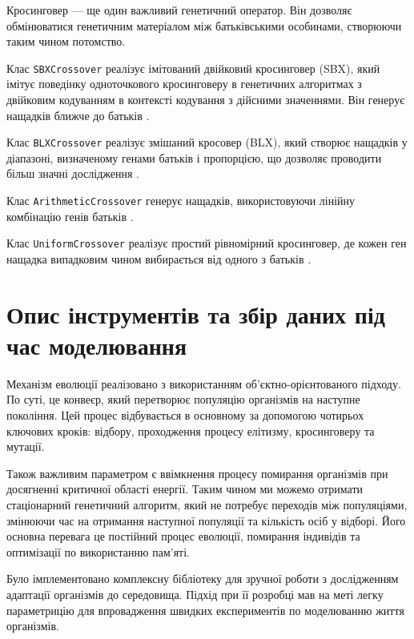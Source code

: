 Кросинговер --- ще один важливий генетичний оператор. 
Він дозволяє обмінюватися генетичним матеріалом між 
батьківськими особинами, створюючи таким чином потомство.

Клас \verb+SBXCrossover+ реалізує імітований двійковий 
кросинговер (SBX), який імітує поведінку одноточкового кросинговеру 
в генетичних алгоритмах з двійковим кодуванням в контексті кодування 
з дійсними значеннями. 
Він генерує нащадків ближче до батьків 
\cite{debSIMULATEDBINARYCROSSOVER, debSelfadaptiveSimulatedBinary2007}.

Клас \verb+BLXCrossover+ реалізує змішаний кросовер (BLX), 
який створює нащадків у діапазоні, визначеному генами батьків 
і пропорцією, що дозволяє проводити більш значні дослідження 
\cite{debSIMULATEDBINARYCROSSOVER}.

Клас \verb+ArithmeticCrossover+ генерує нащадків, 
використовуючи лінійну комбінацію генів батьків 
\cite{koraCrossoverOperatorsGenetic2017}.

Клас \verb+UniformCrossover+ реалізує простий рівномірний кросинговер,
де кожен ген нащадка випадковим чином вибирається від одного з батьків
\cite{koraCrossoverOperatorsGenetic2017}.


\section{Опис інструментів та збір даних під час моделювання}

Механізм еволюції реалізовано з використанням 
об'єктно-орієнтованого підходу. 
По суті, це конвеєр, який перетворює популяцію організмів 
на наступне покоління. 
Цей процес відбувається в основному за допомогою чотирьох 
ключових кроків: відбору, проходження процесу елітизму, 
кросинговеру та мутації.

Також важливим параметром є ввімкнення процесу помирання 
організмів при досягненні критичної області енергії. 
Таким чином ми можемо отримати стаціонарний генетичний алгоритм, 
який не потребує переходів між популяціями,
змінюючи час на отримання наступної популяції та
кількість осіб у відборі. 
Його основна перевага це постійний процес еволюції, 
помирання індивідів та оптимізації по використанню пам’яті.

Було імплементовано комплексну бібліотеку для зручної роботи 
з дослідженням адаптації організмів до середовища. 
Підхід при її розробці мав на меті легку параметрицію для 
впровадження швидких експериментів по моделюванню життя організмів.

